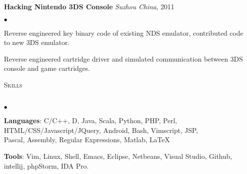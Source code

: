 \documentclass[11pt]{article}
\newcommand{\td}{\textasciitilde}
\newcommand{\lineunder}{\vspace*{-8pt} \\ \hspace*{-18pt} \hrulefill \\}
\newcommand{\header}[2]{{\hspace*{-15pt}\vspace*{6pt} \textsc{\large #1}\hfill{\footnotesize #2}} \vspace*{-6pt} \lineunder}
\newcommand{\URL}[1] {\textbf{\scriptsize #1}}
\newcommand{\SC}[1] {\URL{(#1)}}
\newcommand{\project}[4]{{ \textbf{#1} \emph{#2}, #3
    \ifthenelse{\isempty{#4}}{}{\hfill \SC{#4}\\}   }}
\newenvironment{achievements}{\begin{list}{$\bullet$}{\topsep 0pt \itemsep -2pt}}{\vspace*{2pt}\end{list}}
\begin{document}
\project{Hacking Nintendo 3DS Console}{Suzhou China}{2011}{}
    \begin{achievements}
    \item Reverse engineered key binary code of existing NDS emulator, contributed code to new 3DS emulator.
    \item Reverse engineered cartridge driver and simulated communication between 3DS console and game cartridges.
    \end{achievements}

\header{Skills}{}
\begin{achievements}
\item \textbf{Languages}: \textsf{C/C++, D, Java, Scala, Python, PHP, Perl, HTML/CSS/Javascript/JQuery, Android, Bash,
    Vimscript, JSP,  \\ \quad\quad\quad\quad\quad\quad Pascal, Assembly, Regular Expressions, Matlab, \LaTeX}
\item \textbf{Tools}: \textsf{Vim, Linux, Shell, Emacs, Eclipse, Netbeans, Visual Studio, Github, intellij, phpStorm, IDA Pro.}
\end{achievements}
\end{document}
